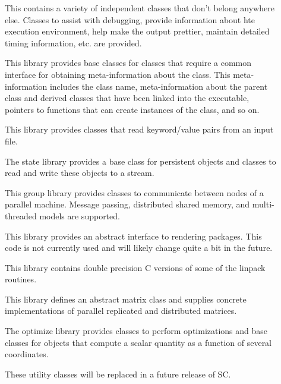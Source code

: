 \documentclass{report}
\begin{document}
\begin{description}
\item[] This contains a variety of independent
  classes that don't belong anywhere else.  Classes to assist with
  debugging, provide information about hte execution environment, help make
  the output prettier, maintain detailed timing information, etc. are
  provided.

\item[] This library provides base classes for
  classes that require a common interface for obtaining meta-information
  about the class.  This meta-information includes the class name,
  meta-information about the parent class and derived classes that have
  been linked into the executable, pointers to functions that can create
  instances of the class, and so on.

\item[] This library provides classes that read
  keyword/value pairs from an input file.

\item[] The state library provides a base class
  for persistent objects and classes to read and write these objects to a
  stream.

\item[] This group library provides classes to
  communicate between nodes of a parallel machine.  Message passing,
  distributed shared memory, and multi-threaded models are supported.

\item[] This library provides an abstract
  interface to rendering packages.  This code is not currently used and
  will likely change quite a bit in the future.

\item[] This library contains double precision
  C versions of some of the linpack routines.

\item[] This library defines an abstract matrix
  class and supplies concrete implementations of parallel replicated and
  distributed matrices.

\item[] The optimize library provides classes
  to perform optimizations and base classes for objects that compute a
  scalar quantity as a function of several coordinates.

\item[] These utility classes will be replaced
  in a future release of SC.


\end{description}
\end{document}
